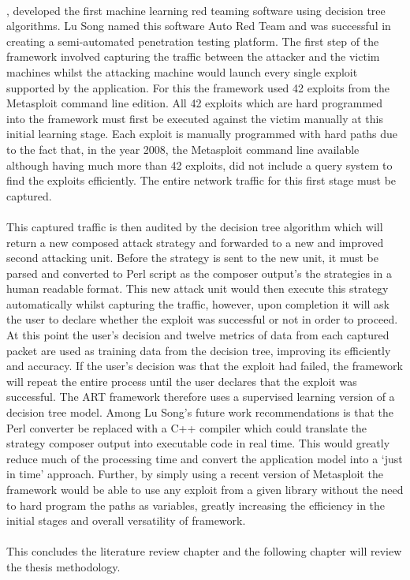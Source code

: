 \paragraph{}\cite{ART}, developed the first machine learning red teaming software using decision tree algorithms. Lu Song named this software Auto Red Team and was successful in creating a semi-automated penetration testing platform. The first step of the framework involved capturing the traffic between the attacker and the victim machines whilst the attacking machine would launch every single exploit supported by the application. For this the framework used 42 exploits from the Metasploit command line edition. All 42 exploits which are hard programmed into the framework must first be executed against the victim manually at this initial learning stage. Each exploit is manually programmed with hard paths due to the fact that, in the year 2008, the Metasploit command line available although having much more than 42 exploits, did not include a query system to find the exploits efficiently. The entire network traffic for this first stage must be captured. 

\paragraph{}This captured traffic is then audited by the decision tree algorithm which will return a new composed attack strategy and forwarded to a new and improved second attacking unit. Before the strategy is sent to the new unit, it must be parsed and converted to Perl script as the composer output’s the strategies in a human readable format. This new attack unit would then execute this strategy automatically whilst capturing the traffic, however, upon completion it will ask the user to declare whether the exploit was successful or not in order to proceed. At this point the user’s decision and twelve metrics of data from each captured packet are used as training data from the decision tree, improving its efficiently and accuracy. If the user’s decision was that the exploit had failed, the framework will repeat the entire process until the user declares that the exploit was successful. The ART framework therefore uses a supervised learning version of a decision tree model. Among Lu Song’s future work recommendations is that the Perl converter be replaced with a C++ compiler which could translate the strategy composer output into executable code in real time. This would greatly reduce much of the processing time and convert the application model into a ‘just in time’ approach. Further, by simply using a recent version of Metasploit the framework would be able to use any exploit from a given library without the need to hard program the paths as variables, greatly increasing the efficiency in the initial stages and overall versatility of framework.

\paragraph{}This concludes the literature review chapter and the following chapter will review the thesis methodology.
